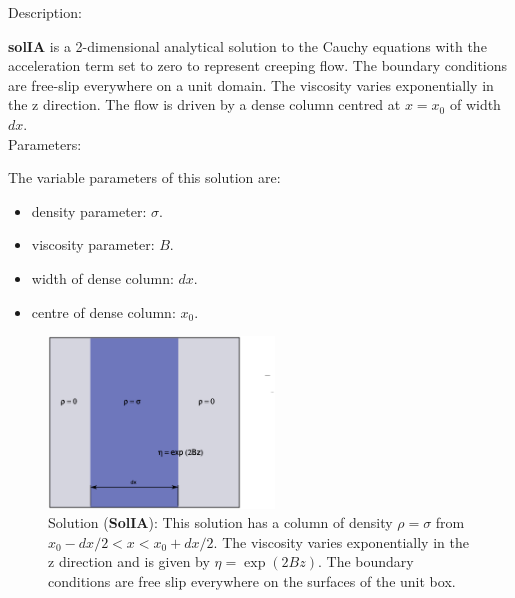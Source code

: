   {\large \fontB Description:}
  
  {\bf solIA} is a 2-dimensional analytical solution to the Cauchy equations with the acceleration term set to zero
  to represent creeping flow. The boundary conditions are free-slip everywhere on a unit domain.  The viscosity varies exponentially in the z direction.
  The flow is driven by a dense column centred at $ x=x_0 $ of width $dx$.
  \\

 {\large \fontB Parameters:}
  
 The variable parameters of this solution are:
 \begin{itemize}
   \item{density parameter: $ \sigma $.}
   \item{viscosity parameter: $B$.}
   \item{width of dense column: $dx$.}
   \item{centre of dense column: $x_0$.}

 \end{itemize}

  \begin{figure}
    \includegraphics[width=6cm,clip]{../figs/figIA.eps}
    \caption[Short caption]{\label{figIA} 
      Solution ({\bf SolIA}):
      This solution has a column of density $\rho = \sigma$ from $x_0-dx/2 < x < x_0+dx/2$.
      The viscosity varies exponentially in the z direction and is given by
      $\eta = \exp (2 B z)$.
      The boundary conditions are free slip everywhere on the surfaces of the unit box.}
  \end{figure} 
  

